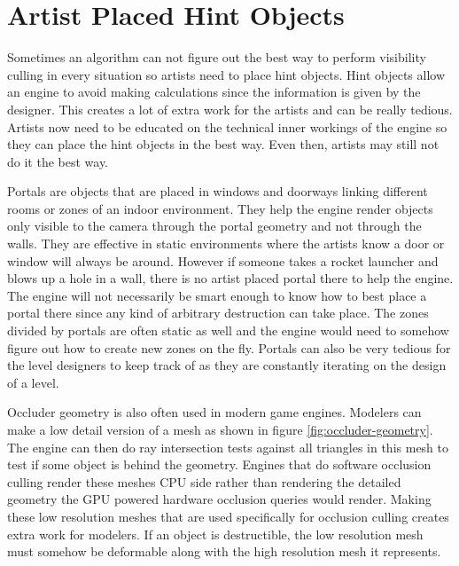 \documentclass[12pt]{ucthesis}
\begin{document}
\section{Artist Placed Hint Objects}
\label{artist-placed-hint-objects}

Sometimes an algorithm can not figure out the best way to perform visibility culling in every situation so artists need to place hint objects.
Hint objects allow an engine to avoid making calculations since the information is given by the designer.
This creates a lot of extra work for the artists and can be really tedious.
Artists now need to be educated on the technical inner workings of the engine so they can place the hint objects in the best way.
Even then, artists may still not do it the best way.

Portals are objects that are placed in windows and doorways linking different rooms or zones of an indoor environment.\cite{Vis-Computations-Densely-Occluded, Doom3-source-review, Portal-culling}
They help the engine render objects only visible to the camera through the portal geometry and not through the walls.
They are effective in static environments where the artists know a door or window will always be around.
However if someone takes a rocket launcher and blows up a hole in a wall, there is no artist placed portal there to help the engine.
The engine will not necessarily be smart enough to know how to best place a portal there since any kind of arbitrary destruction can take place.
The zones divided by portals are often static as well and the engine would need to somehow figure out how to create new zones on the fly.
Portals can also be very tedious for the level designers to keep track of as they are constantly iterating on the design of a level.

Occluder geometry is also often used in modern game engines.
Modelers can make a low detail version of a mesh as shown in figure \ref{fig:occluder-geometry}.\cite{culling-bf}
The engine can then do ray intersection tests against all triangles in this mesh to test if some object is behind the geometry.\cite{Cryengine-culling-explained}
Engines that do software occlusion culling render these meshes CPU side rather than rendering the detailed geometry the GPU powered hardware occlusion queries would render.
Making these low resolution meshes that are used specifically for occlusion culling creates extra work for modelers.
If an object is destructible, the low resolution mesh must somehow be deformable along with the high resolution mesh it represents.
\end{document}
